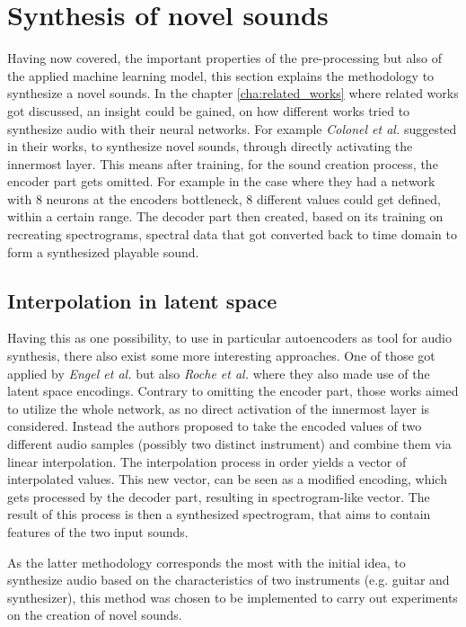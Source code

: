 \section{Synthesis of novel sounds}
\label{sec:app_interpolation}
Having now covered, the important properties of the pre-processing but also of the applied machine learning model, this section explains the methodology to synthesize a novel sounds. In the chapter \ref{cha:related_works} where related works got discussed, an insight could be gained, on how different works tried to synthesize audio with their neural networks. For example \textit{Colonel et al.}\cite{colonel2017improving, colonel2018autoencoding, Colonel2020} suggested in their works, to synthesize novel sounds, through directly activating the innermost layer. This means after training, for the sound creation process, the encoder part gets omitted. For example in the case where they had a network with 8 neurons at the encoders bottleneck, 8 different values could get defined, within a certain range. The decoder part then created, based on its training on recreating spectrograms, spectral data that got converted back to time domain to form a synthesized playable sound. 

\subsection{Interpolation in latent space}
Having this as one possibility, to use in particular autoencoders as tool for audio synthesis, there also exist some more interesting approaches. One of those got applied by \textit{Engel et al.} \cite{Engel2017} but also \textit{Roche et al.} \cite{roche2019autoencoders} where they also made use of the latent space encodings. Contrary to omitting the encoder part, those works aimed to utilize the whole network, as no direct activation of the innermost layer is considered. Instead the authors proposed to take the encoded values of two different audio samples (possibly two distinct instrument) and combine them via linear interpolation. The interpolation process in order yields a vector of interpolated values. This new vector, can be seen as a modified encoding, which gets processed by the decoder part, resulting in spectrogram-like vector. The result of this process is then a synthesized spectrogram, that aims to contain features of the two input sounds.

As the latter methodology corresponds the most with the initial idea, to synthesize audio based on the characteristics of two instruments (e.g. guitar and synthesizer), this method was chosen to be implemented to carry out experiments on the creation of novel sounds.

